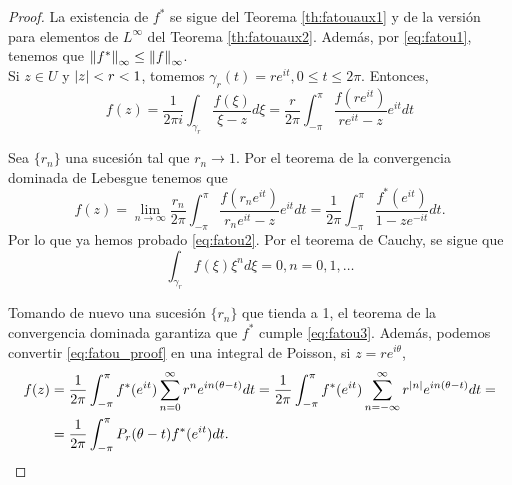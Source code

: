 \begin{proof}
    La existencia de $f^*$ se sigue del Teorema \ref{th:fatouaux1} y de la versión para elementos de $L^\infty$ del Teorema \ref{th:fatouaux2}. Además, por \eqref{eq:fatou1}, tenemos que $\left\lVert f^*\right\rVert_{\infty} \leq \left\lVert f\right\rVert_{\infty}$. \\

    Si $z \in U$ y $\left\lvert z\right\rvert < r < 1$, tomemos $\gamma_r(t) = r e^{it}, 0 \leq t \leq 2\pi$. Entonces,
    \begin{equation*}
        f(z) = \dfrac{1}{2 \pi i} \int_{\gamma_r} \dfrac{f(\xi)}{\xi - z} d\xi =
        \dfrac{r}{2 \pi} \int_{-\pi}^{\pi} \dfrac{f(re^{it})}{re^{it} - z}e^{it} dt
    \end{equation*}

    Sea $\{r_n\}$ una sucesión tal que $r_n \to 1$. Por el teorema de la convergencia dominada de Lebesgue tenemos que %
    \begin{equation}
        \label{eq:fatou_proof}
        f(z) = \lim_{n \to \infty} \frac{r_n}{2 \pi} \int_{-\pi}^{\pi} \frac{f(r_n e^{it})}{r_n e^{it} - z} e^{it} dt =  \dfrac{1}{2 \pi} \int_{-\pi}^{\pi} \dfrac{f^* (e^{it})}{1 - ze^{-it}} dt.
    \end{equation}
    Por lo que ya hemos probado \eqref{eq:fatou2}. Por el teorema de Cauchy, se sigue que
    \begin{equation*}
        \int_{\gamma_r} f(\xi)\xi^n d\xi = 0, n = 0, 1, \dots
    \end{equation*}

    Tomando de nuevo una sucesión $\{r_n\}$ que tienda a 1, el teorema de la convergencia dominada garantiza que $f^*$ cumple \eqref{eq:fatou3}. Además, podemos convertir \eqref{eq:fatou_proof} en una integral de Poisson, si $z = re^{i \theta}$,
    \begin{equation}
        \label{eq:fatou_poisson}
         \begin{split}
             f(z) & = \dfrac{1}{2 \pi} \int_{- \pi}^{\pi} f^*(e^{it}) \sum_{n=0}^{\infty} r^n e^{in(\theta - t)} dt =  \dfrac{1}{2 \pi} \int_{- \pi}^{\pi} f^*(e^{it}) \sum_{n=-\infty}^{\infty} r^{\left\lvert n\right\rvert} e^{in(\theta - t)} dt = \\
                  & =  \dfrac{1}{2 \pi} \int_{- \pi}^{\pi} P_r(\theta - t) f^*(e^{it}) dt.
         \end{split}
    \end{equation}


\end{proof}
